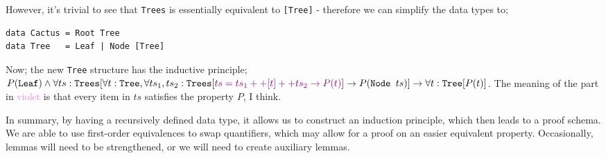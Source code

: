 \documentclass[a4paper, 12pt]{article}
\begin{document}
            However, it's trivial to see that \texttt{Trees} is essentially equivalent to \texttt{[Tree]} - therefore we can simplify the data types to;
            \begin{verbatim}
data Cactus = Root Tree
data Tree   = Leaf | Node [Tree]\end{verbatim}
            Now; the new \texttt{Tree} structure has the inductive principle; $P(\texttt{Leaf}) \land \forall ts : \texttt{Trees} [\forall t : \texttt{Tree}, \forall ts_1, ts_2 : \texttt{Trees} [\textcolor{violet}{ts = ts_1 ++ [t] ++ ts_2 \rightarrow P(t)}] \rightarrow P(\texttt{Node } ts)] \rightarrow \forall t : \texttt{Tree} [P(t)]$. The meaning of the part in \textcolor{violet}{violet} is that every item in $ts$ satisfies the property $P$, I think.
            \medskip

            In summary, by having a recursively defined data type, it allows us to construct an induction principle, which then leads to a proof schema. We are able to use first-order equivalences to swap quantifiers, which may allow for a proof on an easier equivalent property. Occasionally, lemmas will need to be strengthened, or we will need to create auxiliary lemmas.
\end{document}
